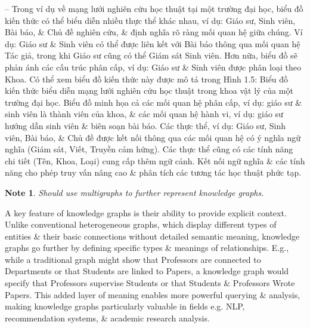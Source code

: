 \documentclass{article}
\newtheorem{note}{Note}
\begin{document}
\begin{itemize}
\begin{itemize}
\begin{itemize}
\begin{itemize}
                -- Trong ví dụ về mạng lưới nghiên cứu học thuật tại một trường đại học, biểu đồ kiến thức có thể biểu diễn nhiều thực thể khác nhau, ví dụ: Giáo sư, Sinh viên, Bài báo, \& Chủ đề nghiên cứu, \& định nghĩa rõ ràng mối quan hệ giữa chúng. Ví dụ: Giáo sư \& Sinh viên có thể được liên kết với Bài báo thông qua mối quan hệ Tác giả, trong khi Giáo sư cũng có thể Giám sát Sinh viên. Hơn nữa, biểu đồ sẽ phản ánh các cấu trúc phân cấp, ví dụ: Giáo sư \& Sinh viên được phân loại theo Khoa. Có thể xem biểu đồ kiến thức này được mô tả trong {\sf Hình 1.5: Biểu đồ kiến thức biểu diễn mạng lưới nghiên cứu học thuật trong khoa vật lý của một trường đại học. Biểu đồ minh họa cả các mối quan hệ phân cấp, ví dụ: giáo sư \& sinh viên là thành viên của khoa, \& các mối quan hệ hành vi, ví dụ: giáo sư hướng dẫn sinh viên \& biên soạn bài báo. Các thực thể, ví dụ: Giáo sư, Sinh viên, Bài báo, \& Chủ đề được kết nối thông qua các mối quan hệ có ý nghĩa ngữ nghĩa (Giám sát, Viết, Truyền cảm hứng). Các thực thể cũng có các tính năng chi tiết (Tên, Khoa, Loại) cung cấp thêm ngữ cảnh. Kết nối ngữ nghĩa \& các tính năng cho phép truy vấn nâng cao \& phân tích các tương tác học thuật phức tạp.}
                \begin{note}
                    Should use multigraphs to further represent knowledge graphs.
                \end{note}
                A key feature of knowledge graphs is their ability to provide explicit context. Unlike conventional heterogeneous graphs, which display different types of entities \& their basic connections without detailed semantic meaning, knowledge graphs go further by defining specific types \& meanings of relationships. E.g., while a traditional graph might show that Professors are connected to Departments or that Students are linked to Papers, a knowledge graph would specify that Professors supervise Students or that Students \& Professors Wrote Papers. This added layer of meaning enables more powerful querying \& analysis, making knowledge graphs particularly valuable in fields e.g. NLP, recommendation systems, \& academic research analysis.


\end{itemize}
\end{itemize}
\end{itemize}
\end{itemize}
\end{document}
